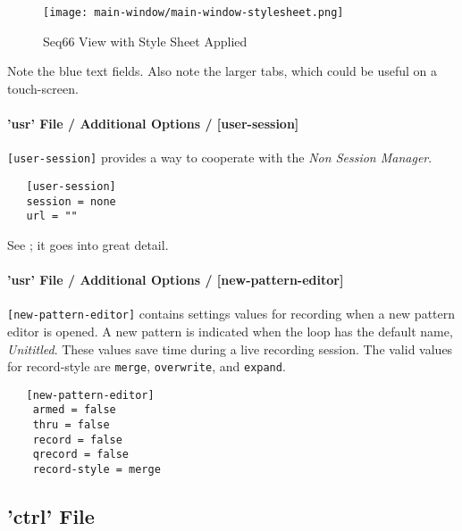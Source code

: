 \begin{figure}[H]
   \centering 
   \texttt{[image: main-window/main-window-stylesheet.png]}
   \caption{Seq66 View with Style Sheet Applied}
   \label{fig:view_with_style_sheet_applied}
\end{figure}

   Note the blue text fields. Also note the larger tabs, which could be useful on
   a touch-screen.

\paragraph{'usr' File / Additional Options / [user-session]}
\label{paragraph:user_file_added_options_session}

   \texttt{[user-session]} provides a way to cooperate with the
   \textsl{Non Session Manager}.

   \begin{verbatim}
   [user-session]
   session = none
   url = ""
   \end{verbatim}

   See ; it goes into great
   detail.

\paragraph{'usr' File / Additional Options / [new-pattern-editor]}
\label{paragraph:user_file_added_options_pattern_editor}

   \texttt{[new-pattern-editor]} contains settings values for recording
	 when a new pattern editor is opened. A new pattern is indicated when
	the loop has the default name, \textsl{Unititled}.
 	These values save time during a live recording session.
   The valid values for record-style are \texttt{merge},
 	\texttt{overwrite}, and \texttt{expand}.

   \begin{verbatim}
   [new-pattern-editor]
	armed = false
	thru = false
	record = false
	qrecord = false
	record-style = merge
   \end{verbatim}

\subsection{'ctrl' File}
\label{subsec:configuration_ctrl}

